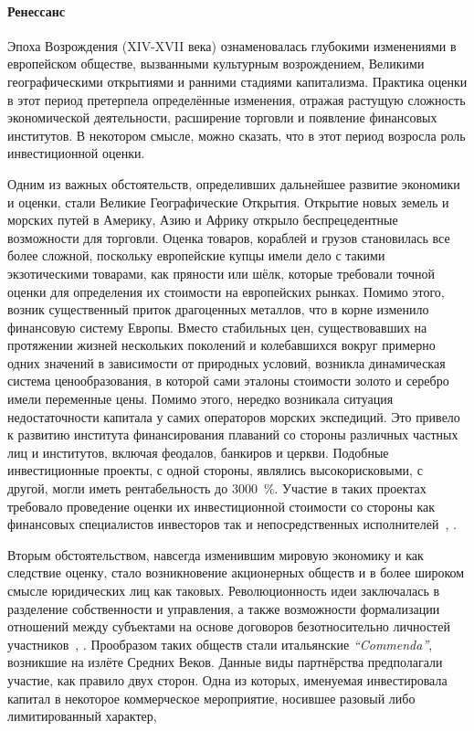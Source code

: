 \documentclass[12pt]{scrartcl}
\begin{document}
\paragraph{Ренессанс}
Эпоха Возрождения (XIV-XVII века) ознаменовалась глубокими изменениями в европейском обществе, вызванными культурным возрождением, Великими географическими открытиями и ранними стадиями капитализма. Практика оценки в этот период претерпела определённые изменения, отражая растущую сложность экономической деятельности, расширение торговли и появление финансовых институтов. В некотором смысле, можно сказать, что в этот период возросла роль инвестиционной оценки.

Одним из важных обстоятельств, определивших дальнейшее развитие экономики и оценки, стали Великие Географические Открытия. Открытие новых земель и морских путей в Америку, Азию и Африку открыло беспрецедентные возможности для торговли. Оценка товаров, кораблей и грузов становилась все более сложной, поскольку европейские купцы имели дело с такими экзотическими товарами, как пряности или шёлк, которые требовали точной оценки для определения их стоимости на европейских рынках. Помимо этого, возник существенный приток драгоценных металлов, что в корне изменило финансовую систему Европы. Вместо стабильных цен, существовавших на протяжении жизней нескольких поколений и колебавшихся вокруг примерно одних значений в зависимости от природных условий, возникла динамическая система ценообразования, в которой сами эталоны стоимости золото и серебро имели переменные цены. Помимо этого, нередко возникала ситуация недостаточности капитала у самих операторов морских экспедиций. Это привело к развитию института финансирования плаваний со стороны различных частных лиц и институтов, включая феодалов, банкиров и церкви. Подобные инвестиционные проекты, с одной стороны, являлись высокорисковыми, с другой, могли иметь рентабельность до 3000~\%. Участие в таких проектах требовало проведение оценки их инвестиционной стоимости со стороны как финансовых специалистов инвесторов так и непосредственных исполнителей~\cite{Braudel1983}, \cite{Pomeranz2021}.

Вторым обстоятельством, навсегда изменившим мировую экономику и как следствие оценку, стало возникновение акционерных обществ и в более широком смысле юридических лиц как таковых. Революционность идеи заключалась в разделение собственности и управления, а также возможности формализации отношений между субъектами на основе договоров безотносительно личностей участников~\cite{Lopez2001}, \cite{Luzzatto1954}. Прообразом таких обществ стали итальянские \textit{``Commenda''}, возникшие на излёте Средних Веков. Данные виды партнёрства предполагали участие, как правило двух сторон. Одна из которых, именуемая инвестировала капитал в некоторое коммерческое мероприятие, носившее разовый либо лимитированный характер,
\end{document}

